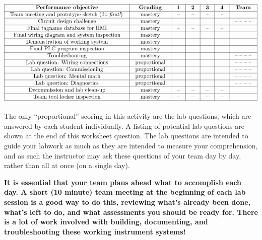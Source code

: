 $$\vbox{\offinterlineskip
\halign{\strut
\vrule \quad\hfil # \ \hfil & 
\vrule \quad\hfil # \ \hfil & 
\vrule \quad\hfil # \ \hfil & 
\vrule \quad\hfil # \ \hfil & 
\vrule \quad\hfil # \ \hfil & 
\vrule \quad\hfil # \ \hfil & 
\vrule \quad\hfil # \ \hfil \vrule \cr
\noalign{\hrule}
%
{\bf Performance objective} & {\bf Grading} & {\bf 1} & {\bf 2} & {\bf 3} & {\bf 4} & {\bf Team} \cr
%
\noalign{\hrule}
%
Team meeting and prototype sketch (do {\it first!}) & mastery & -- & -- & -- & -- & \cr
%
\noalign{\hrule}
%
Circuit design challenge & mastery & & & & & -- -- -- -- \cr
%
\noalign{\hrule}
%
Final tagname database for HMI & mastery & -- & -- & -- & -- & \cr
%
\noalign{\hrule}
%
Final wiring diagram and system inspection & mastery & & & & & -- -- -- -- \cr
%
\noalign{\hrule}
%
Demonstration of working system & mastery & -- & -- & -- & -- & \cr
%
\noalign{\hrule}
%
Final PLC program inspection & mastery &  &  &  &  & -- -- -- --  \cr
%
\noalign{\hrule}
%
Troubleshooting & mastery & & & & & -- -- -- -- \cr
%
\noalign{\hrule}
%
Lab question: Wiring connections & proportional &  &  &  &  & -- -- -- -- \cr
%
\noalign{\hrule}
%
Lab question: Commissioning & proportional &  &  &  &  & -- -- -- -- \cr
%
\noalign{\hrule}
%
Lab question: Mental math & proportional &  &  &  &  & -- -- -- -- \cr
%
\noalign{\hrule}
%
Lab question: Diagnostics & proportional &  &  &  &  & -- -- -- -- \cr
%
\noalign{\hrule}
%
Decommission and lab clean-up & mastery & -- & -- & -- & -- &  \cr
%
\noalign{\hrule}
%
Team tool locker inspection & mastery & -- & -- & -- & -- &  \cr
%
\noalign{\hrule}
} %
}$$ %

The only ``proportional'' scoring in this activity are the lab questions, which are answered by each student individually.  A listing of potential lab questions are shown at the end of this worksheet question.  The lab questions are intended to guide your labwork as much as they are intended to measure your comprehension, and as such the instructor may ask these questions of your team day by day, rather than all at once (on a single day).

\vskip 10pt

{\bf It is essential that your team plans ahead what to accomplish each day.  A short (10 minute) team meeting at the beginning of each lab session is a good way to do this, reviewing what's already been done, what's left to do, and what assessments you should be ready for.  There is a lot of work involved with building, documenting, and troubleshooting these working instrument systems!}

